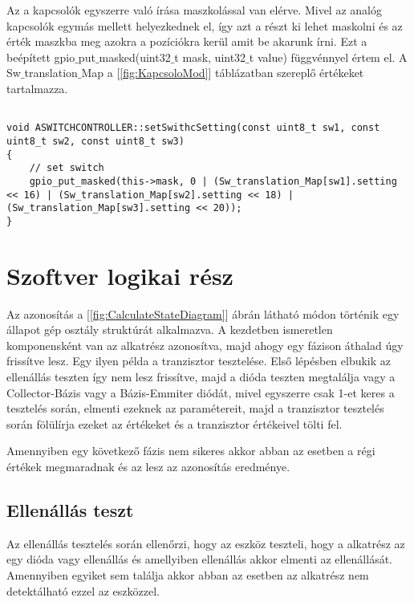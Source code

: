 Az a kapcsolók egyszerre való írása maszkolással van elérve. Mivel az 
analóg kapcsolók egymás mellett helyezkednek el, így azt a 
részt ki lehet maskolni és az érték maszkba meg azokra a pozíciókra
kerül amit be akarunk írni. Ezt a beépített gpio$\_$put$\_$masked(uint32$\_$t mask, uint32$\_$t value)
függvénnyel értem el. A Sw$\_$translation$\_$Map a [\ref{fig:KapcsoloMod}] táblázatban
szereplő értékeket tartalmazza.


\begin{lstlisting}

void ASWITCHCONTROLLER::setSwithcSetting(const uint8_t sw1, const uint8_t sw2, const uint8_t sw3)
{
    // set switch
    gpio_put_masked(this->mask, 0 | (Sw_translation_Map[sw1].setting << 16) | (Sw_translation_Map[sw2].setting << 18) | (Sw_translation_Map[sw3].setting << 20));
}

\end{lstlisting}


\section{Szoftver logikai rész}

Az azonosítás a [\ref{fig:CalculateStateDiagram}] ábrán látható
módon történik egy állapot gép osztály struktúrát alkalmazva.
A kezdetben ismeretlen komponensként van az alkatrész azonosítva,
majd ahogy egy fázison áthalad úgy frissítve lesz. 
Egy ilyen példa a tranzisztor tesztelése. Első lépésben elbukik az 
ellenállás teszten így nem lesz frissítve, majd a dióda teszten
megtalálja vagy a Collector-Bázis vagy a Bázis-Emmiter diódát, 
mivel egyszerre csak 1-et keres a tesztelés során, elmenti ezeknek az 
paramétereit, majd a tranzisztor tesztelés során fölülírja ezeket az értékeket 
és a tranzisztor értékeivel tölti fel.

Amennyiben egy következő fázis nem sikeres akkor abban az esetben 
a régi értékek megmaradnak és az lesz az azonosítás eredménye.

\subsection{Ellenállás teszt}

Az ellenállás tesztelés során ellenőrzi, hogy az eszköz teszteli, 
hogy a alkatrész az egy dióda vagy ellenállás és amellyiben ellenállás 
akkor elmenti az ellenállását. Amennyiben egyiket sem találja
akkor abban az esetben az alkatrész nem detektálható ezzel az eszközzel.

